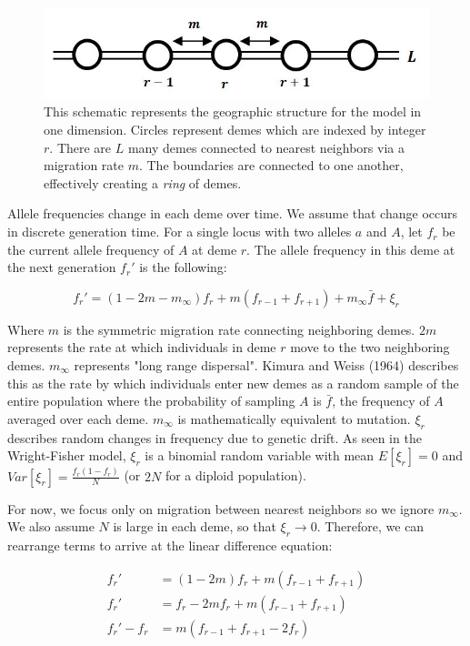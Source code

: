 \begin{figure}[h]
    \centering
    \includegraphics[scale=0.8]{img/model_schematic.JPG}
    \caption{This schematic represents the geographic structure for the model in one dimension. Circles represent demes which are indexed by integer $r$. There are $L$ many demes connected to nearest neighbors via a migration rate $m$. The boundaries are connected to one another, effectively creating a \textit{ring} of demes.}
    \label{fig:schematic}
\end{figure}


Allele frequencies change in each deme over time. We assume that change occurs in discrete generation time. For a single locus with two alleles $a$ and $A$, let $f_r$ be the current allele frequency of $A$ at deme $r$. The allele frequency in this deme at the next generation $f_r'$ is the following:

\begin{equation}
    f_r' = (1-2m-m_\infty)f_r + m(f_{r-1} + f_{r+1}) + m_\infty \bar{f} + \xi_r
\end{equation}


Where $m$ is the symmetric migration rate connecting neighboring demes. $2m$ represents the rate at which individuals in deme $r$ move to the two neighboring demes. $m_\infty$ represents "long range dispersal". Kimura and Weiss (1964) \cite{kimura_1964} describes this as the rate by which individuals enter new demes as a random sample of the entire population where the probability of sampling $A$ is $\bar{f}$, the frequency of $A$ averaged over each deme. $m_\infty$ is mathematically equivalent to mutation. $\xi_r$ describes random changes in frequency due to genetic drift. As seen in the Wright-Fisher model, $\xi_r$ is a binomial random variable with mean $E[\xi_r]=0$ and $Var[\xi_r] = \frac{f_r(1-f_r)}{N}$ (or $2N$ for a diploid population).


For now, we focus only on migration between nearest neighbors so we ignore $m_\infty$. We also assume $N$ is large in each deme, so that $\xi_r \to 0$. Therefore, we can rearrange terms to arrive at the linear difference equation:

\begin{equation}
    \begin{split}
        f_r' &= (1-2m)f_r + m(f_{r-1} + f_{r+1}) \\ 
        f_r' &= f_r -2mf_r + m(f_{r-1} + f_{r+1}) \\
        f_r' - f_r &= m(f_{r-1} + f_{r+1} - 2f_r)
    \end{split}
\end{equation}


